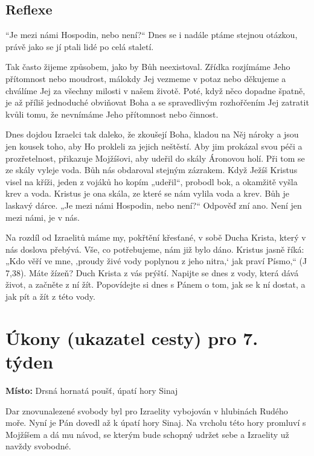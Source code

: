 \documentclass[11pt]{article}
\begin{document}
\subsection*{Reflexe}
“Je mezi námi Hospodin, nebo není?“ Dnes se i nadále ptáme stejnou otázkou, právě jako se jí ptali lidé po celá staletí.

Tak často žijeme způsobem, jako by Bůh neexistoval. Zřídka rozjímáme Jeho přítomnost nebo moudrost, málokdy Jej
vezmeme v potaz nebo děkujeme a chválíme Jej za všechny milosti v našem životě. Poté, když něco dopadne špatně, je
až příliš jednoduché obviňovat Boha a se spravedlivým rozhořčením Jej zatratit kvůli tomu, že nevnímáme Jeho
přítomnost nebo činnost.

Dnes dojdou Izraelci tak daleko, že zkoušejí Boha, kladou na Něj nároky a jsou jen kousek toho, aby Ho prokleli za
jejich neštěstí. Aby jim prokázal svou péči a prozřetelnost, přikazuje Mojžíšovi, aby udeřil do skály Áronovou holí. Při
tom se ze skály vyleje voda. Bůh nás obdaroval stejným zázrakem. Když Ježíš Kristus visel na kříži, jeden z vojáků ho
kopím „udeřil“, probodl bok, a okamžitě vyšla krev a voda. Kristus je ona skála, ze které se nám vylila voda a krev.
Bůh je laskavý dárce. „Je mezi námi Hospodin, nebo není?“ Odpověď zní ano. Není jen mezi námi, je v nás.

Na rozdíl od Izraelitů máme my, pokřtění křesťané, v sobě Ducha Krista, který v nás doslova přebývá. Vše, co
potřebujeme, nám již bylo dáno. Kristus jasně říká: „Kdo věří ve mne, ‚proudy živé vody poplynou z jeho nitra,‘ jak
praví Písmo,“ (J 7,38). Máte žízeň? Duch Krista z vás prýští. Napijte se dnes z vody, která dává život, a začněte z ní
žít. Popovídejte si dnes s Pánem o tom, jak se k ní dostat, a jak pít a žít z této vody.



\newpage
\section*{Úkony (ukazatel cesty) pro 7. týden}

\textbf{Místo:} Drsná hornatá poušť, úpatí hory Sinaj

Dar znovunalezené svobody byl pro Izraelity vybojován v hlubinách Rudého moře. Nyní je Pán dovedl až
k úpatí hory Sinaj. Na vrcholu této hory promluví s Mojžíšem a dá mu návod, se kterým bude schopný udržet
sebe a Izraelity už navždy svobodné.
\end{document}
